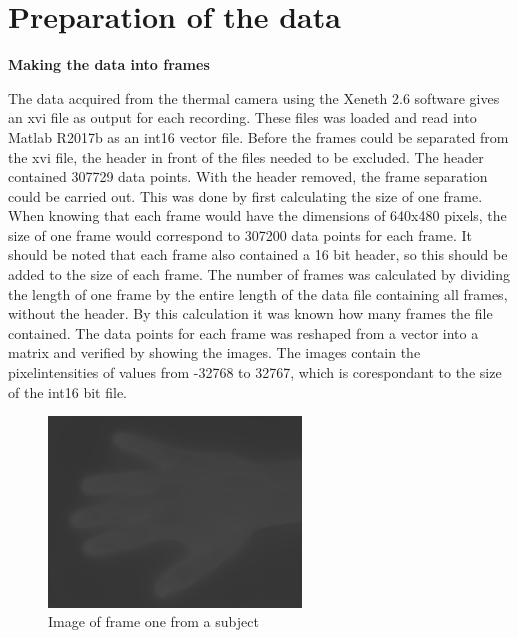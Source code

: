 \chapter{Preparation of the data}

\textbf{Making the data into frames}

The data acquired from the thermal camera using the Xeneth 2.6 software gives an xvi file as output for each recording. These files was loaded and read into Matlab R2017b as an int16 vector file. Before the frames could be separated from the xvi file, the header in front of the files needed to be excluded. The header contained 307729 data points. With the header removed, the frame separation could be carried out. This was done by first calculating the size of one frame. When knowing that each frame would have the dimensions of 640x480 pixels, the size of one frame would correspond to 307200 data points for each frame. It should be noted that each frame also contained a 16 bit header, so this should be added to the size of each frame. The number of frames was calculated by dividing the length of one frame by the entire length of the data file containing all frames, without the header. By this calculation it was known how many frames the file contained. The data points for each frame was reshaped from a vector into a matrix and verified by showing the images. 
The images contain the pixelintensities of values from -32768 to 32767, which is corespondant to the size of the int16 bit file. 


\begin{figure}[H]
	\includegraphics[width=0.6\textwidth]{figures/uint16Hand}  %
	\caption{Image of frame one from a subject}
	\label{fig:hand}  %
\end{figure}